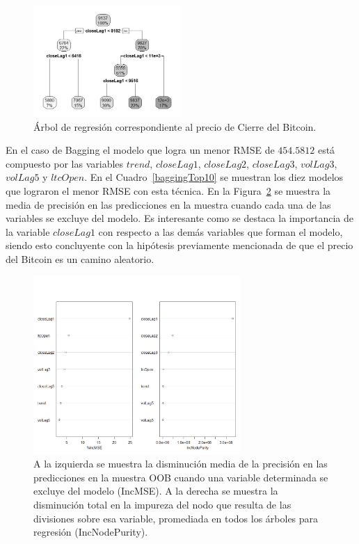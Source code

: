 \documentclass[a4paper,12pt,twocolumn]{article}
\begin{document}
\begin{figure}[!hbt]
\centering
\includegraphics[width=0.5\textwidth]{decisionsTree}
\caption{Árbol de regresión correspondiente al precio de Cierre del Bitcoin.}
\label{decisionTree}
\end{figure}

En el caso de Bagging el modelo que logra un menor RMSE de $454.5812$ está compuesto por las variables $trend$, $closeLag1$, $closeLag2$, $closeLag3$, $volLag3$, $volLag5$ y $ltcOpen$. En el Cuadro~\ref{baggingTop10} se muestran los diez modelos que lograron el menor RMSE con esta técnica. En la Figura~\ref{baggingVariableImportancia}  se muestra la media de precisión en las predicciones en la muestra cuando cada una de las variables se excluye del modelo. Es interesante como se destaca la importancia de la variable $closeLag1$ con respecto a las demás variables que forman el modelo, siendo esto concluyente con la hipótesis previamente mencionada de que el precio del Bitcoin es un camino aleatorio. 


\begin{figure}[!hbt]
\centering
\includegraphics[width=0.7\textwidth]{baggingVariableImportancia}
\caption{A la izquierda se muestra la disminución media de la precisión en las predicciones en la muestra OOB cuando una variable determinada se excluye del modelo (IncMSE). A la derecha se muestra la disminución total en la impureza del nodo que resulta de las divisiones sobre esa variable, promediada en todos los árboles para regresión (IncNodePurity).}
\label{baggingVariableImportancia}
\end{figure}
\end{document}
